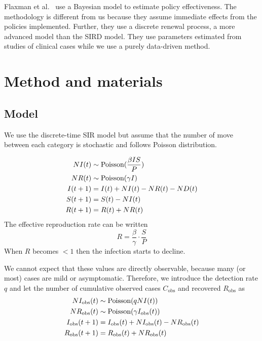 \documentclass{amsart}
\begin{document}
Flaxman et al.~\cite{Flaxman2020} use a Bayesian model to estimate policy effectiveness.
The methodology is different from us because they assume immediate effects from the policies implemented.
Further, they use a discrete renewal process, a more advanced model than the SIRD model.
They use parameters estimated from studies of clinical cases while we use a purely data-driven method.

\section{Method and materials}

\subsection{Model}

We use the discrete-time SIR model but assume that the number of move between each category is stochastic and follows Poisson distribution.

\begin{align}
 NI(t) &\sim \textup{Poisson}(\frac{\beta I S}{P})\\
 NR(t) &\sim \textup{Poisson}(\gamma I)\\
 I(t+1) &= I(t) + NI(t) - NR(t) - ND(t)\\
 S(t+1) &= S(t) - NI(t)\\
 R(t+1) &= R(t) + NR(t)
\end{align}
The effective reproduction rate can be written
\begin{equation}
 R = \frac{\beta}{\gamma} \cdot \frac{S}{P}
\end{equation}
When $R$ becomes $<1$ then the infection starts to decline.

We cannot expect that these values are directly observable, because many (or most) cases are mild or asymptomatic.
Therefore, we introduce the detection rate $q$ and let the number of cumulative observed cases $C_{\text{obs}}$ and recovered $R_{\text{obs}}$ as
\begin{align}
 NI_{\text{obs}}(t) &\sim \textup{Poisson}(q NI(t))\\
 NR_{\text{obs}}(t) &\sim \textup{Poisson}(\gamma I_{\text{obs}}(t))\\
 I_{\text{obs}}(t+1) &= I_{\text{obs}}(t) + NI_{\text{obs}}(t) - NR_{\text{obs}}(t)\\
 R_{\text{obs}}(t+1) &= R_{\text{obs}}(t) + NR_{\text{obs}}(t)
\end{align}
\end{document}
